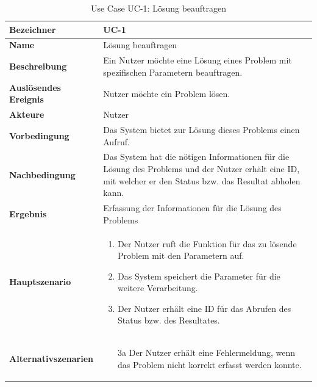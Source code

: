 \begin{table}[ht]
\centering
  \begin{tabular}{ l | p{10cm} }
	\hline
	\rowcolor{gray}
	\textbf{Bezeichner}	&	\textbf{UC-1}\\ \hline
	\textbf{Name}		&	Lösung beauftragen\\ \hline
	\textbf{Beschreibung}	&	Ein Nutzer möchte eine Lösung eines Problem mit spezifischen Parametern beauftragen.\\ \hline
	\textbf{Auslösendes Ereignis} &	Nutzer möchte ein Problem lösen.\\ \hline
	\textbf{Akteure}		&	Nutzer\\ \hline
	\textbf{Vorbedingung}	&	Das System bietet zur Lösung dieses Problems einen Aufruf.\\ \hline
	\textbf{Nachbedingung}	&	Das System hat die nötigen Informationen für die Lösung des Problems und der Nutzer erhält eine ID, mit welcher er den Status bzw. das Resultat 
						abholen kann.\\ \hline
	\textbf{Ergebnis}		&	Erfassung der Informationen für die Lösung des Problems\\ \hline
	\textbf{Hauptszenario}	&	\begin{enumerate}
					\item Der Nutzer ruft die Funktion für das zu lösende Problem mit den Parametern auf.
					\item Das System speichert die Parameter für die weitere Verarbeitung.
					\item Der Nutzer erhält eine ID für das Abrufen des Status bzw. des Resultates.
					\end{enumerate}
					\\ \hline
	\textbf{Alternativszenarien}	&	\begin{enumerate}
					\item[3a] Der Nutzer erhält eine Fehlermeldung, wenn das Problem nicht korrekt erfasst werden konnte.
					\end{enumerate}
					\\ \hline
  \end{tabular}
   \caption{Use Case UC-1: Lösung beauftragen}\label{table:use_case_1}
\end{table}

